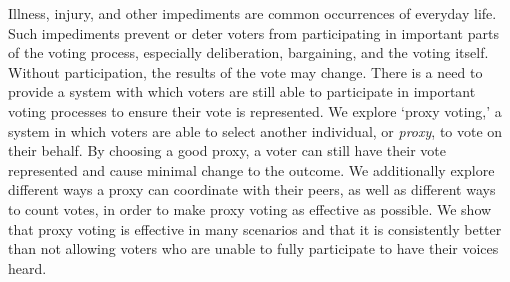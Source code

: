 %
%
%

\begin{publicabstract}

    Illness, injury, and other impediments are common occurrences of everyday life.
    Such impediments prevent or deter voters from participating in important parts
    of the voting process, especially deliberation, bargaining, and the voting
    itself.
    Without participation, the results of the vote may change.
    There is a need to provide a system with which voters are still able to
    participate in important voting processes to ensure their vote is represented.
    We explore `proxy voting,' a system in which voters are able to select another
    individual, or \textit{proxy}, to vote on their behalf.
    By choosing a good proxy, a voter can still have their vote represented and cause minimal change to the outcome.
    We additionally explore different ways a proxy can coordinate with their peers,
    as well as different ways to count votes, in order to make proxy voting as
    effective as possible.
    We show that proxy voting is effective in many scenarios and that it is
    consistently better than not allowing voters who are unable to fully participate to
    have their voices heard.

\end{publicabstract}


